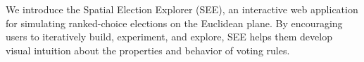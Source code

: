 We introduce the Spatial Election Explorer (SEE),
an interactive web application for simulating ranked-choice elections on the Euclidean plane.
By encouraging users to iteratively build, experiment, and explore,
SEE helps them develop visual intuition about the properties and behavior of voting rules.
